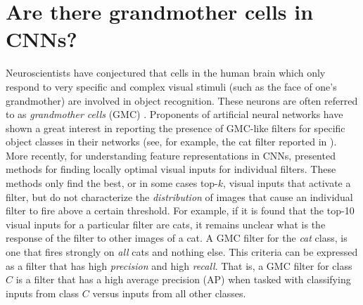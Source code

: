 \section{Are there grandmother cells in CNNs?}
\label{sec:grand-mother}
Neuroscientists have conjectured that cells in the human brain which only respond to very specific and complex visual stimuli (such as the face of one's grandmother) are involved in object recognition.
These neurons are often referred to as \emph{grandmother cells} (GMC) \cite{Barlow,Grandmother}. Proponents of artificial neural networks have shown a great interest in reporting the presence of GMC-like filters for specific object classes in their networks (see, for example, the cat filter reported in \cite{GoogleCat}). More recently, for understanding feature representations in CNNs, \cite{Simonyan,DeConv} presented methods for finding locally optimal visual inputs for individual filters.
These methods only find the best, or in some cases top-$k$, visual inputs that activate a filter, but do not characterize the \emph{distribution} of images that cause an individual filter to fire above a certain threshold. For example, if it is found that the top-10 visual inputs for a particular filter are cats, it remains unclear what is the response of the filter to other images of a cat.
A GMC filter for the \emph{cat} class, is one that fires strongly on \emph{all} cats and nothing else.
This criteria can be expressed as a filter that has high \emph{precision} and high \emph{recall}.
That is, a GMC filter for class $C$ is a filter that has a high average precision (AP) when tasked with classifying inputs from class $C$ versus inputs from all other classes.

 
